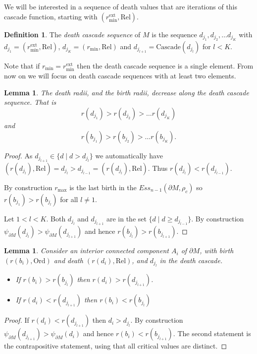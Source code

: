 \documentclass[a4paper,11pt]{article}
\newtheorem{lemma}[theorem]{Lemma}
\theoremstyle{definition}
\newtheorem{defn}[theorem]{Definition}  \newtheorem{ex}[theorem]{Example}  \newtheorem{exs}[theorem]{Examples}  \newtheorem{question}[theorem]{Question}
\newcommand{\Rel}{\textrm{Rel}}
\newcommand{\Cascade}{\text{Cascade}}
\begin{document}
We will be interested in a sequence of death values that are iterations of this cascade function, starting with $(r_{\min}^{\text{ext}}, \text{Rel})$. 

\begin{defn}\label{def:cascadeSeq}
The \emph{death cascade sequence} of $M$ is the sequence $d_{j_1}, d_{j_2}, \ldots d_{j_K}$ with $d_{j_1}=(r_{\min}^{\text{ext}}, \text{Rel})$, $d_{j_K}=(r_{\min}, \text{Rel})$ and $d_{j_{l+1}}=\Cascade(d_{j_{l}})$ for $l<K$.   
\end{defn}


Note that if $r_{\min}= r_{\min}^{\text{ext}}$ then the death cascade sequence is a single element. From now on we will focus on death cascade sequences with at least two elements. 

\begin{lemma}\label{lem:decreaseradii}
The death radii, and the birth radii, decrease along the death cascade sequence. That is $$r(d_{j_1})>r(d_{j_2})>\ldots r(d_{j_K})$$ 
and 
$$r(b_{j_1})>r(b_{j_2})>\ldots r(b_{j_K}).$$
\end{lemma}
\begin{proof}
As $d_{j_{l+1}}\in \{d\mid d> d_{j_l}\}$ we automatically have $(r(d_{j_l}), \Rel)= d_{j_{l}}>d_{j_{l-1}}=(r(d_{j_{l}}), \Rel)$. Thus $r(d_{j_l})<r(d_{j_{l-1}})$. 

By construction $r_{\max}$ is the last birth in the $Ess_{n-1}(\partial M, \rho_c)$ so $r(b_{j_1})>r(b_{j_l})$ for all $l\neq 1$. 

Let $1<l<K$. Both $d_{j_l}$ and $d_{j_{l+1}}$ are in the set $\{d \mid d\geq d_{j_{l-1}}\}$. By construction $\psi_{\partial M}(d_{j_l})>\psi_{\partial M}(d_{j_{l+1}})$ and hence $r(b_{j_l})>r(b_{j_{l+1}})$.
\end{proof}

\begin{lemma}\label{lem:orderbirths}
Consider an interior connected component $A_i$ of $\partial M$, with birth $(r(b_i), \textrm{Ord})$ and death $(r(d_i), \textrm{Rel})$, and $d_{j_l}$ in the death cascade. 
\begin{itemize}
\item If $r(b_i) > r(b_{j_{l}})$ then $r(d_i)>r(d_{j_{l+1}})$. 
\item If $r(d_i)< r(d_{j_{l+1}})$ then $r(b_i) < r(b_{j_l})$ 
\end{itemize}
\end{lemma}
\begin{proof}
If $r(d_i) < r(d_{j_{l+1}})$ then $d_i>d_{j_{l}}$. By construction $\psi_{\partial M}(d_{j_{l+1}})>\psi_{\partial M}(d_{i})$ and hence $r(b_i)<r(b_{j_{l+1}})$. The second statement is the contrapositive statement, using that all critical values are distinct.
\end{proof}
\end{document}
